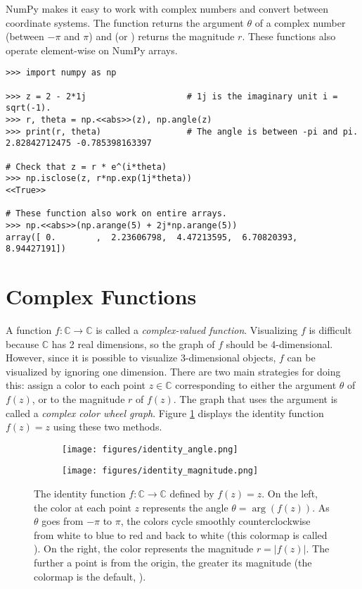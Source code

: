 NumPy makes it easy to work with complex numbers and convert between coordinate systems.
The function  returns the argument $\theta$ of a complex number (between $-\pi$ and $\pi$) and  (or ) returns the magnitude $r$.
These functions also operate element-wise on NumPy arrays.

\begin{lstlisting}
>>> import numpy as np

>>> z = 2 - 2*1j                    # 1j is the imaginary unit i = sqrt(-1).
>>> r, theta = np.<<abs>>(z), np.angle(z)
>>> print(r, theta)                 # The angle is between -pi and pi.
2.82842712475 -0.785398163397

# Check that z = r * e^(i*theta)
>>> np.isclose(z, r*np.exp(1j*theta))
<<True>>

# These function also work on entire arrays.
>>> np.<<abs>>(np.arange(5) + 2j*np.arange(5))
array([ 0.        ,  2.23606798,  4.47213595,  6.70820393,  8.94427191])
\end{lstlisting}

\section*{Complex Functions} %

A function $f: \mathbb{C} \rightarrow \mathbb{C}$ is called a \emph{complex-valued function}.
Visualizing $f$ is difficult because $\mathbb{C}$ has 2 real dimensions, so the graph of $f$ should be 4-dimensional.
However, since it is possible to visualize 3-dimensional objects, $f$ can be visualized by ignoring one dimension.
There are two main strategies for doing this: assign a color to each point $z\in\mathbb{C}$ corresponding to either the argument $\theta$ of $f(z)$, or to the magnitude $r$ of $f(z)$.
The graph that uses the argument is called a \emph{complex color wheel graph}.
Figure \ref{fig:complex-identity-angle-mag} displays the identity function $f(z) = z$ using these two methods.

\begin{figure}[H] %
\captionsetup[subfigure]{justification=centering}
\centering
\begin{subfigure}{.49\textwidth}
    \centering
    \texttt{[image: figures/identity\_angle.png]}
\end{subfigure}
%
\begin{subfigure}{.49\textwidth}
    \centering
    \texttt{[image: figures/identity\_magnitude.png]}
\end{subfigure}
\caption{The identity function $f: \mathbb{C} \rightarrow \mathbb{C}$ defined by $f(z)=z$. On the left, the color at each point $z$ represents the angle $\theta = \arg(f(z))$. As $\theta$ goes from $-\pi$ to $\pi$, the colors cycle smoothly counterclockwise from white to blue to red and back to white (this colormap is called ). On the right, the color represents the magnitude $r = |f(z)|$. The further a point is from the origin, the greater its magnitude (the colormap is the default, ).
}
\label{fig:complex-identity-angle-mag}
\end{figure}

